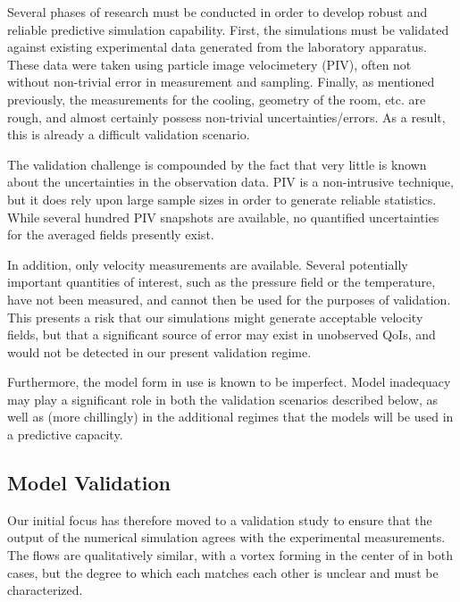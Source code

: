 \documentclass{article}
\begin{document}
Several phases of research must be conducted in order to develop robust
and reliable predictive simulation capability. First, the simulations
must be validated against existing experimental data generated from the
laboratory apparatus. These data were taken using particle image
velocimetery (PIV), often not without non-trivial error in measurement and
sampling. Finally, as mentioned previously, the measurements for the
cooling, geometry of the room, etc. are rough, and almost certainly
possess non-trivial uncertainties/errors. As a result, this is already a
difficult validation scenario. 

The validation challenge is compounded by the fact that very little is
known about the uncertainties in the observation data. PIV is a
non-intrusive technique, but it does rely upon large sample sizes in
order to generate reliable statistics. While several hundred PIV
snapshots are available, no quantified uncertainties for the averaged fields
presently exist.  

In addition, only velocity measurements are available. Several
potentially important quantities of interest, such as the pressure field
or the temperature, have not been measured, and cannot then be used for
the purposes of validation. This presents a risk that our 
simulations might generate acceptable velocity fields, but that a
significant source of error may exist in unobserved QoIs, and would not
be detected in our present validation regime. 

Furthermore, the model form in use is known to be imperfect. 
Model inadequacy may play a significant role in both the validation
scenarios described below, as well as (more chillingly) in the
additional regimes that the models will be used in a predictive
capacity. 

%
%
\subsection{Model Validation}
Our initial focus has therefore moved to a validation study to ensure that the
output of the numerical simulation agrees with the experimental
measurements. The flows are qualitatively similar, with a vortex forming
in the center of in both cases, but the degree to which each matches
each other is unclear and must be characterized. 
\end{document}
